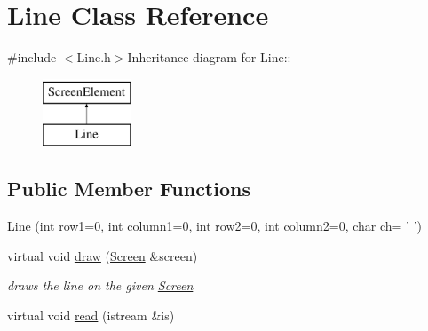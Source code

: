 \hypertarget{classLine}{
\section{Line Class Reference}
\label{classLine}
}


{\ttfamily \#include $<$Line.h$>$}Inheritance diagram for Line::\begin{figure}[H]
\begin{center}
\leavevmode
\includegraphics[height=2cm]{classLine}
\end{center}
\end{figure}
\subsection*{Public Member Functions}
\begin{DoxyCompactItemize}
\item 
\hyperlink{classLine_a1012aa02dc32f538f8a677748bd5d328}{Line} (int row1=0, int column1=0, int row2=0, int column2=0, char ch= ' ')
\item 
virtual void \hyperlink{classLine_a0f119b83f7c23a1bf27b6d34f93b63f2}{draw} (\hyperlink{classScreen}{Screen} \&screen)
\begin{DoxyCompactList}\small\item\em draws the line on the given \hyperlink{classScreen}{Screen} \item\end{DoxyCompactList}\item 
virtual void \hyperlink{classLine_a8ca52eabbd2ede5f52cf6c220a4c2f2c}{read} (istream \&is)
\end{DoxyCompactItemize}
